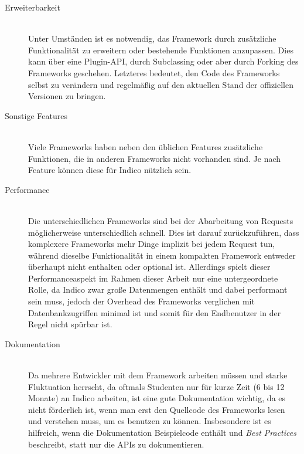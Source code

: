\begin{description}
\item[Erweiterbarkeit] \hfill \\
Unter Umständen ist es notwendig, das Framework durch zusätzliche Funktionalität zu erweitern oder
bestehende Funktionen anzupassen. Dies kann über eine Plugin-API, durch Subclassing oder aber durch
Forking des Frameworks geschehen. Letzteres bedeutet, den Code des Frameworks selbst zu verändern
und regelmäßig auf den aktuellen Stand der offiziellen Versionen zu bringen.

\item[Sonstige Features] \hfill \\
Viele Frameworks haben neben den üblichen Features zusätzliche Funktionen, die in anderen Frameworks
nicht vorhanden sind. Je nach Feature können diese für Indico nützlich sein.

\item[Performance] \hfill \\
Die unterschiedlichen Frameworks sind bei der Abarbeitung von Requests möglicherweise
unterschiedlich schnell. Dies ist darauf zurückzuführen, dass komplexere Frameworks mehr Dinge
implizit bei jedem Request tun, während dieselbe Funktionalität in einem kompakten Framework
entweder überhaupt nicht enthalten oder optional ist. Allerdings spielt dieser Performanceaspekt
im Rahmen dieser Arbeit nur eine untergeordnete Rolle, da Indico zwar große Datenmengen enthält und
dabei performant sein muss, jedoch der Overhead des Frameworks verglichen mit Datenbankzugriffen
minimal ist und somit für den Endbenutzer in der Regel nicht spürbar ist.

\item[Dokumentation] \hfill \\
Da mehrere Entwickler mit dem Framework arbeiten müssen und starke Fluktuation herrscht, da oftmals
Studenten nur für kurze Zeit (6 bis 12 Monate) an Indico arbeiten, ist eine gute Dokumentation
wichtig, da es nicht förderlich ist, wenn man erst den Quellcode des Frameworks lesen und
verstehen muss, um es benutzen zu können. Insbesondere ist es hilfreich, wenn die Dokumentation
Beispielcode enthält und \emph{Best Practices} beschreibt, statt nur die APIs zu dokumentieren.


\end{description}
